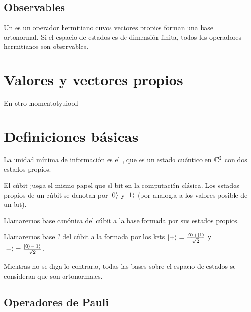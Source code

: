 \subsection{Observables}\label{subsec:observables}
Un  es un operador hermitiano cuyos vectores propios forman una base ortonormal.
Si el espacio de estados es de dimensión finita, todos los operadores hermitianos son observables.

\section{Valores y vectores propios}\label{sec:valores-y-vectores-propios}
En otro momentotyuiooll

\section{Definiciones básicas}\label{sec:definiciones-basicas}

\begin{definition}[Cúbit]
	La unidad mínima de información es el , que es un estado cuántico en $\mathbb{C}^2$ con
	dos estados propios.
\end{definition}

El cúbit juega el mismo papel que el bit en la computación clásica.
Los estados propios de un cúbit se denotan por $\ket{0}$ y $\ket{1}$ (por analogía a los valores posible de un bit).

\begin{definition}
	Llamaremos base canónica del cúbit a la base formada por sus estados propios.
\end{definition}

\begin{definition}
	Llamaremos base ? del cúbit a la formada por los kets $\ket{+}=\frac{\ket{0}+\ket{1}}{\sqrt{2}}$ y
	$\ket{-}=\frac{\ket{0}+\ket{1}}{\sqrt{2}}$.
\end{definition}

Mientras no se diga lo contrario, todas las bases sobre el espacio de estados se consideran que son ortonormales.

\subsection{Operadores de Pauli}\label{subsec:operadores-de-pauli}

